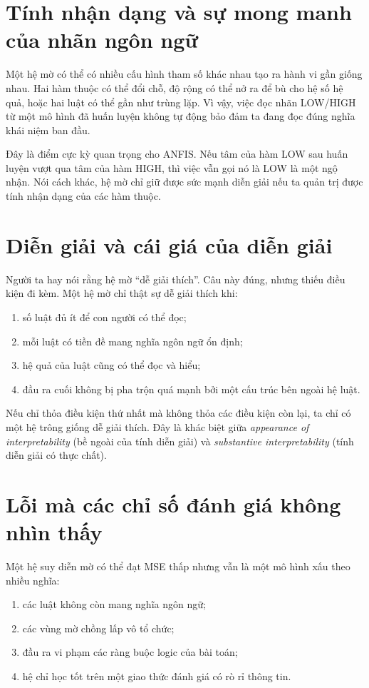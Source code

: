 \section{Tính nhận dạng và sự mong manh của nhãn ngôn ngữ}

Một hệ mờ có thể có nhiều cấu hình tham số khác nhau tạo ra hành vi gần giống nhau. Hai hàm thuộc có thể đổi chỗ, độ rộng có thể nở ra để bù cho hệ số hệ quả, hoặc hai luật có thể gần như trùng lặp. Vì vậy, việc đọc nhãn LOW/HIGH từ một mô hình đã huấn luyện không tự động bảo đảm ta đang đọc đúng nghĩa khái niệm ban đầu.

Đây là điểm cực kỳ quan trọng cho ANFIS. Nếu tâm của hàm LOW sau huấn luyện vượt qua tâm của hàm HIGH, thì việc vẫn gọi nó là LOW là một ngộ nhận. Nói cách khác, hệ mờ chỉ giữ được sức mạnh diễn giải nếu ta quản trị được tính nhận dạng của các hàm thuộc.

\section{Diễn giải và cái giá của diễn giải}

Người ta hay nói rằng hệ mờ ``dễ giải thích''. Câu này đúng, nhưng thiếu điều kiện đi kèm. Một hệ mờ chỉ thật sự dễ giải thích khi:

\begin{enumerate}
\item số luật đủ ít để con người có thể đọc;
\item mỗi luật có tiền đề mang nghĩa ngôn ngữ ổn định;
\item hệ quả của luật cũng có thể đọc và hiểu;
\item đầu ra cuối không bị pha trộn quá mạnh bởi một cấu trúc bên ngoài hệ luật.
\end{enumerate}

Nếu chỉ thỏa điều kiện thứ nhất mà không thỏa các điều kiện còn lại, ta chỉ có một hệ trông giống dễ giải thích. Đây là khác biệt giữa \emph{appearance of interpretability} (bề ngoài của tính diễn giải) và \emph{substantive interpretability} (tính diễn giải có thực chất).

\section{Lỗi mà các chỉ số đánh giá không nhìn thấy}

Một hệ suy diễn mờ có thể đạt MSE thấp nhưng vẫn là một mô hình xấu theo nhiều nghĩa:

\begin{enumerate}
\item các luật không còn mang nghĩa ngôn ngữ;
\item các vùng mờ chồng lấp vô tổ chức;
\item đầu ra vi phạm các ràng buộc logic của bài toán;
\item hệ chỉ học tốt trên một giao thức đánh giá có rò rỉ thông tin.
\end{enumerate}

